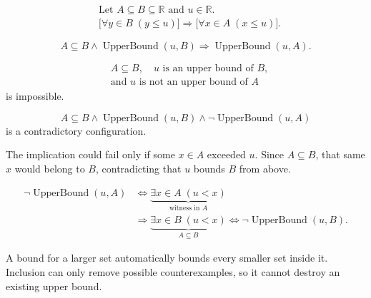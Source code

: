 \begin{remark*}
\[
\begin{aligned}
&\text{Let }A\subseteq B\subseteq\mathbb{R}\text{ and }u\in\mathbb{R}.\\
&\bigl[\forall y\in B\;(y\le u)\bigr]
\Longrightarrow
\bigl[\forall x\in A\;(x\le u)\bigr].
\end{aligned}
\]
\end{remark*}

\begin{remark*}
\[
A\subseteq B\land \operatorname{UpperBound}(u,B)
\Longrightarrow
\operatorname{UpperBound}(u,A).
\]
\end{remark*}

\begin{remark*}
\[
\begin{aligned}
&A\subseteq B,\quad u\text{ is an upper bound of }B,\\
&\text{and }u\text{ is not an upper bound of }A
\end{aligned}
\]
is impossible.
\end{remark*}

\begin{remark*}
\[
A\subseteq B\land \operatorname{UpperBound}(u,B)\land \neg\operatorname{UpperBound}(u,A)
\]
is a contradictory configuration.
\end{remark*}

\begin{remark*}
The implication could fail only if some $x\in A$ exceeded $u$. Since $A\subseteq B$, that same $x$ would belong to $B$, contradicting that $u$ bounds $B$ from above.
\end{remark*}

\begin{remark*}
\[
\begin{aligned}
\neg\operatorname{UpperBound}(u,A)
&\Longleftrightarrow
\underbrace{\exists x\in A\;(u<x)}_{\text{witness in }A}\\
&\Longrightarrow
\underbrace{\exists x\in B\;(u<x)}_{A\subseteq B}
\Longleftrightarrow
\neg\operatorname{UpperBound}(u,B).
\end{aligned}
\]
\end{remark*}

\begin{remark*}[Interpretation]
A bound for a larger set automatically bounds every smaller set inside it. Inclusion can only remove possible counterexamples, so it cannot destroy an existing upper bound.
\end{remark*}

